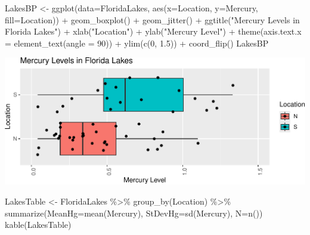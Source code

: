 \documentclass[
  letterpaper,
  DIV=11,
  numbers=noendperiod]{scrreprt}
\newenvironment{Shaded}{\begin{snugshade}}{\end{snugshade}}
\newcommand{\AttributeTok}[1]{\textcolor[rgb]{0.40,0.45,0.13}{#1}}
\newcommand{\DecValTok}[1]{\textcolor[rgb]{0.68,0.00,0.00}{#1}}
\newcommand{\FloatTok}[1]{\textcolor[rgb]{0.68,0.00,0.00}{#1}}
\newcommand{\FunctionTok}[1]{\textcolor[rgb]{0.28,0.35,0.67}{#1}}
\newcommand{\NormalTok}[1]{\textcolor[rgb]{0.00,0.23,0.31}{#1}}
\newcommand{\OtherTok}[1]{\textcolor[rgb]{0.00,0.23,0.31}{#1}}
\newcommand{\SpecialCharTok}[1]{\textcolor[rgb]{0.37,0.37,0.37}{#1}}
\newcommand{\StringTok}[1]{\textcolor[rgb]{0.13,0.47,0.30}{#1}}
\begin{document}
\begin{Shaded}
\begin{Highlighting}[]
\NormalTok{LakesBP }\OtherTok{\textless{}{-}} \FunctionTok{ggplot}\NormalTok{(}\AttributeTok{data=}\NormalTok{FloridaLakes, }\FunctionTok{aes}\NormalTok{(}\AttributeTok{x=}\NormalTok{Location, }\AttributeTok{y=}\NormalTok{Mercury, }\AttributeTok{fill=}\NormalTok{Location)) }\SpecialCharTok{+} 
  \FunctionTok{geom\_boxplot}\NormalTok{() }\SpecialCharTok{+}   \FunctionTok{geom\_jitter}\NormalTok{() }\SpecialCharTok{+} \FunctionTok{ggtitle}\NormalTok{(}\StringTok{"Mercury Levels in Florida Lakes"}\NormalTok{) }\SpecialCharTok{+} 
  \FunctionTok{xlab}\NormalTok{(}\StringTok{"Location"}\NormalTok{) }\SpecialCharTok{+} \FunctionTok{ylab}\NormalTok{(}\StringTok{"Mercury Level"}\NormalTok{) }\SpecialCharTok{+} \FunctionTok{theme}\NormalTok{(}\AttributeTok{axis.text.x =} \FunctionTok{element\_text}\NormalTok{(}\AttributeTok{angle =} \DecValTok{90}\NormalTok{)) }\SpecialCharTok{+} \FunctionTok{ylim}\NormalTok{(}\FunctionTok{c}\NormalTok{(}\DecValTok{0}\NormalTok{, }\FloatTok{1.5}\NormalTok{)) }\SpecialCharTok{+} \FunctionTok{coord\_flip}\NormalTok{() }
\NormalTok{LakesBP}
\end{Highlighting}
\end{Shaded}

\includegraphics{Ch3_files/figure-pdf/unnamed-chunk-178-1.pdf}

\begin{Shaded}
\begin{Highlighting}[]
\NormalTok{LakesTable }\OtherTok{\textless{}{-}}\NormalTok{ FloridaLakes }\SpecialCharTok{\%\textgreater{}\%} \FunctionTok{group\_by}\NormalTok{(Location) }\SpecialCharTok{\%\textgreater{}\%} \FunctionTok{summarize}\NormalTok{(}\AttributeTok{MeanHg=}\FunctionTok{mean}\NormalTok{(Mercury), }\AttributeTok{StDevHg=}\FunctionTok{sd}\NormalTok{(Mercury),  }\AttributeTok{N=}\FunctionTok{n}\NormalTok{())}
\FunctionTok{kable}\NormalTok{(LakesTable)}
\end{Highlighting}
\end{Shaded}
\end{document}
